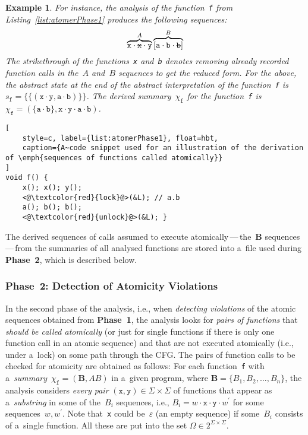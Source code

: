 \documentclass{ExcelAtFIT}
\theoremstyle{example}
\newtheorem{example}{Example}[section]
\def\uv#1{\iflanguage{british}{``#1''}{\quotedblbase #1\textquotedblleft}}
\begin{document}
\begin{example}
    For instance, the analysis of the function~\texttt{f} from Listing~\ref{list:atomerPhase1} produces the following sequences:
    $$
        \overbrace{\mathtt{x} \cdot \text{\texttt{\sout{x}}} \cdot \mathtt{y}}^A \overbrace{[\mathtt{a} \cdot \mathtt{b} \cdot \text{\texttt{\sout{b}}}]}^B
    $$
    The strikethrough of the functions~\texttt{x} and~\texttt{b} denotes removing already recorded function calls in the~$ A $ and~$ B $ sequences to get the reduced form. For the above, the abstract state at the end of the abstract interpretation of the function~\texttt{f} is $ s_\mathtt{f} = \{\{(\mathtt{x} \cdot \mathtt{y}, \mathtt{a} \cdot \mathtt{b})\}\} $. The derived summary~$ \chi_\mathtt{f} $ for the function~\texttt{f} is $ \chi_\mathtt{f} = {(\{{\mathtt{a} \cdot \mathtt{b}}\}, {\mathtt{x} \cdot \mathtt{y} \cdot \mathtt{a} \cdot \mathtt{b}})} $.
\end{example}

\begin{lstlisting}[
    style=c, label={list:atomerPhase1}, float=hbt,
    caption={A~code snippet used for an illustration of the derivation of \emph{sequences of functions called atomically}}
]
void f() {
    x(); x(); y();
    <@\textcolor{red}{lock}@>(&L); // a.b
    a(); b(); b();
    <@\textcolor{red}{unlock}@>(&L); }
\end{lstlisting}

The derived sequences of calls assumed to execute atomically\,---\,the~$ \boldsymbol{B} $ sequences\,---\,from the summaries of all analysed functions are stored into a~file used during \textbf{Phase~2}, which is described below.

\subsubsection{Phase~2: Detection of Atomicity Violations}

In the second phase of the analysis, i.e., when \emph{detecting violations} of the atomic sequences obtained from \textbf{Phase~1}, the analysis looks for \emph{pairs of functions} that \emph{should be called atomically} (or just for single functions if there is only one function call in an atomic sequence) and that are not executed atomically (i.e., under a~lock) on some path through the CFG. The pairs of function calls to be checked for atomicity are obtained as follows: For each function~\texttt{f} with a~\emph{summary}~$ \chi_\mathtt{f} = {(\boldsymbol{B}, AB)} $ in a~given program, where $ \boldsymbol{B} = {\{B_1, B_2, \ldots, B_n\}} $, the analysis considers \emph{every pair} $ {(\mathtt{x}, \mathtt{y})} \in \Sigma \times \Sigma $ of functions that appear as a~\emph{substring} in some of the~$ B_i $ sequences, i.e., $ B_i = w \cdot \mathtt{x} \cdot \mathtt{y} \cdot w^\prime $ for some sequences~$ w, w^\prime $. Note that~\texttt{x} could be~$ \varepsilon $ (an empty sequence) if some~$ B_i $ consists of a~single function. All these \uv{atomic pairs} are put into the set $ \Omega \in 2^{\Sigma \times \Sigma} $.
\end{document}

